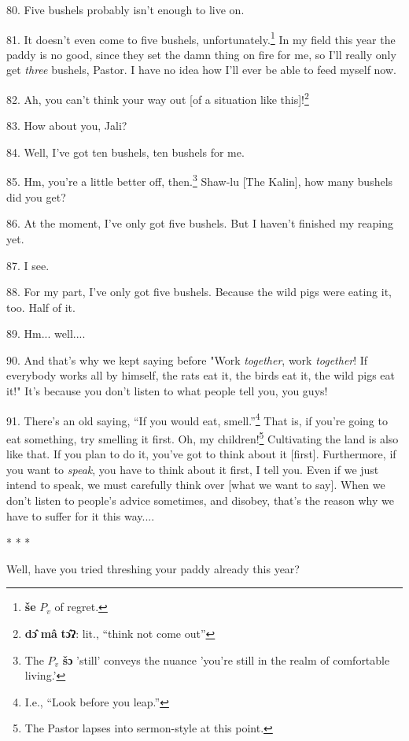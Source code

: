 80. Five bushels probably isn't enough to live on.

81. It doesn't even come to five bushels, unfortunately.\footnote{\textbf{še} $P_v$ of regret.} In my field this year
the paddy is no good, since they set the damn thing on fire for me, so I'll really
only get \textit{three} bushels, Pastor. I have no idea how I'll ever be able to
feed myself now.

82. Ah, you can't think your way out [of a situation like this]!\footnote{\textbf{dɔ̂} \textbf{mâ} \textbf{tɔ̂ʔ}: lit., ``think not come out''}

83. How about you, Jali?

84. Well, I've got ten bushels, ten bushels for me.

85. Hm, you're a little better off, then.\footnote{The $P_v$ \textbf{šɔ} 'still' conveys the nuance 'you're still in the realm of comfortable living.'} Shaw-lu [The Kalin], how many bushels
did you get?

86. At the moment, I've only got five bushels. But I haven't finished my reaping
yet.

87. I see.

88. For my part, I've only got five bushels. Because the wild pigs were eating
it, too. Half of it.

89. Hm... well....

90. And that's why we kept saying before "Work\textit{ together}, work
\textit{together}! If everybody works all by himself, the rats eat it, the birds
eat it, the wild pigs eat it!" It's because you don't listen to what people
tell you, you guys!

91. There's an old saying, ``If you would eat, smell.''\footnote{I.e., ``Look before you leap.''} That
is, if you're going to eat something, try smelling it first. Oh, my children!\footnote{The Pastor lapses into sermon-style at this point.}
Cultivating the land is also like that. If you plan to do it, you've got to think
about it [first]. Furthermore, if you want to \textit{speak}, you have to think
about it first, I tell you. Even if we just intend to speak, we must carefully
think over [what we want to say]. When we don't listen to people's advice sometimes,
and disobey, that's the reason why we have to suffer for it this way....

\begin{center}
* * *
\end{center}

Well, have you tried threshing your paddy already this year?


